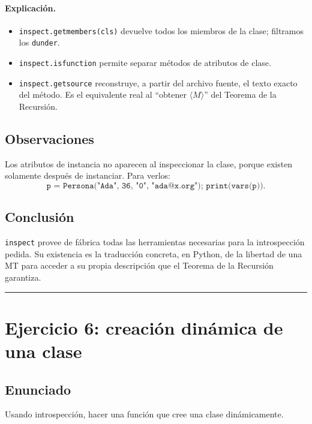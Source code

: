\documentclass[11pt,a4paper]{article}
\theoremstyle{plain}
\theoremstyle{definition}
\theoremstyle{remark}
\newcommand{\enc}[1]{\langle #1\rangle}
\begin{document}
\paragraph{Explicaci\'on.}
\begin{itemize}
  \item \texttt{inspect.getmembers(cls)} devuelve todos los miembros de la
        clase; filtramos los \texttt{dunder}.
  \item \texttt{inspect.isfunction} permite separar m\'etodos de atributos
        de clase.
  \item \texttt{inspect.getsource} reconstruye, a partir del archivo fuente,
        el texto exacto del m\'etodo. Es el equivalente real al
        ``obtener $\enc{M}$'' del Teorema de la Recursi\'on.
\end{itemize}

\subsection*{Observaciones}

Los atributos de instancia no aparecen al inspeccionar la clase, porque
existen solamente despu\'es de instanciar. Para verlos:
\[
  \texttt{p = Persona("Ada", 36, "0", "ada@x.org"); print(vars(p))}.
\]

\subsection*{Conclusi\'on}

\texttt{inspect} provee de f\'abrica todas las herramientas necesarias para
la introspecci\'on pedida. Su existencia es la traducci\'on concreta, en
Python, de la libertad de una MT para acceder a su propia descripci\'on que
el Teorema de la Recursi\'on garantiza.

\bigskip\hrule\bigskip

\section{Ejercicio 6: creaci\'on din\'amica de una clase}
\label{sec:ej6}

\subsection*{Enunciado}

Usando introspecci\'on, hacer una funci\'on que cree una clase din\'amicamente.
\end{document}
